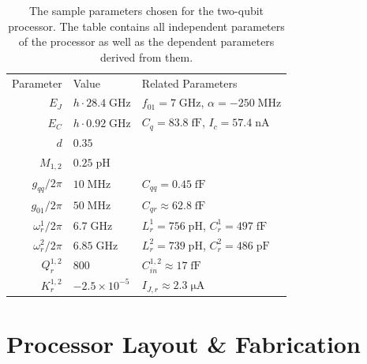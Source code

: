 \begin{table}
	\centering
	\begin{tabularx}{\textwidth}{r|X|l}
	Parameter & Value & Related Parameters \\ [0.3cm]
	$E_J$ & $h\cdot 28.4\;\mathrm{GHz}$ & $f_{01}=7\;\mathrm{GHz}$, $\alpha=-250\;\mathrm{MHz}$ \\ [0.3cm]
	$E_C$ & $h\cdot 0.92\;\mathrm{GHz}$ & $C_q = 83.8\;\mathrm{fF}$, $I_c = 57.4 \;\mathrm{nA}$\\ [0.3cm]
	$d$ & $0.35$ & \\ [0.3cm]
	$M_{1,2}$ & $0.25\;\mathrm{pH}$ & \\ [0.3cm]
	$g_{qq}/2\pi$  & $10\;\mathrm{MHz}$ & $C_{qq}=0.45\;\mathrm{fF}$ \\ [0.3cm]
	$g_{01}/2\pi$  & $50\;\mathrm{MHz}$ & $C_{qr}\approx 62.8 \;\mathrm{fF}$ \\ [0.3cm]
	$\omega_r^{1}/2\pi$ & $6.7\;\mathrm{GHz}$ & $L_r^1 = 756\;\mathrm{pH}$, $C_r^1= 497 \;\mathrm{fF}$ \\ [0.3cm]
	$\omega_r^{2}/2\pi$ & $6.85\;\mathrm{GHz}$ & $L_r^2 = 739\;\mathrm{pH}$, $C_r^2= 486 \;\mathrm{pF}$\\ [0.3cm]
	$Q_r^{1,2}$ & $800$ & $C_{in}^{1,2}\approx 17 \;\mathrm{fF}$ \\ [0.3cm]
	$K_r^{1,2}$ & $-2.5\times 10^{-5}$ & $I_{J,r}\approx 2.3 \;\mathrm{\mu A}$ \\ [0.3cm] 
	\end{tabularx}
	\caption[]{The sample parameters chosen for the two-qubit processor. The table contains all independent parameters of the processor as well as the dependent parameters derived from them.}
	\label{table:processor_parameters}
\end{table}

\section{Processor Layout \& Fabrication}

